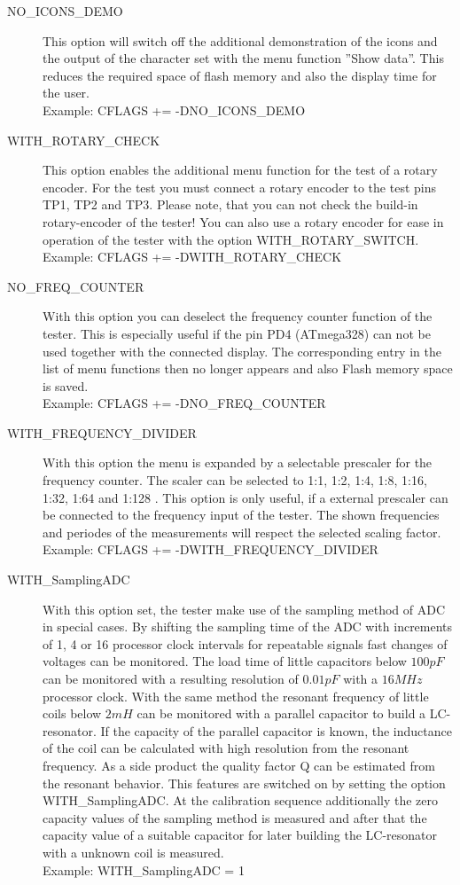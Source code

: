\begin{description}
 \item[NO\_ICONS\_DEMO]
This option will switch off the additional demonstration of the icons and the output of the character set with
the menu function ''Show data''.
This reduces the required space of flash memory  and also the display time for the user.\\
Example: CFLAGS += -DNO\_ICONS\_DEMO

 \item[WITH\_ROTARY\_CHECK]
This option enables the additional menu function for the test of a rotary encoder.
For the test you must connect a rotary encoder to the test pins TP1, TP2 and TP3.
Please note, that you can not check the build-in rotary-encoder of the tester!
You can also use a rotary encoder for ease in operation of the tester with the option WITH\_ROTARY\_SWITCH.\\
Example: CFLAGS += -DWITH\_ROTARY\_CHECK

 \item[NO\_FREQ\_COUNTER]
With this option you can deselect the frequency counter function of the tester.
This is especially useful if the pin PD4 (ATmega328) can not be used together with the
connected display.
The corresponding entry in the list of menu functions then no longer appears and also
Flash memory space is saved.\\
Example: CFLAGS += -DNO\_FREQ\_COUNTER

 \item[WITH\_FREQUENCY\_DIVIDER]
With this option the menu is expanded by a selectable prescaler for the frequency counter.
The scaler can be selected to 1:1, 1:2, 1:4, 1:8, 1:16, 1:32, 1:64 and 1:128 .
This option is only useful, if a external prescaler can be connected to the frequency input of the tester.
The shown frequencies and periodes of the measurements will respect the selected scaling factor.\\
Example: CFLAGS += -DWITH\_FREQUENCY\_DIVIDER

  \item[WITH\_SamplingADC] With this option set, the tester make use of the sampling method of ADC in special cases.
By shifting the sampling time of the ADC with increments of 1, 4 or 16 processor clock intervals for repeatable signals
fast changes of voltages can be monitored.
The load time of little capacitors below \(100pF\) can be monitored with a resulting resolution of \(0.01pF\) with a \(16MHz\) processor clock.
With the same method the resonant frequency of little coils below \(2mH\) can be monitored with a parallel capacitor to build a LC-resonator.
If the capacity of the parallel capacitor is known, the inductance of the coil can be calculated with high resolution from
the resonant frequency. As a side product the quality factor Q can be estimated from the resonant behavior.
This features are switched on by setting the option WITH\_SamplingADC.
At the calibration sequence additionally the zero capacity values of the sampling method is measured and
after that the capacity value of a suitable capacitor for later building the LC-resonator with a unknown coil is measured.\\
Example: WITH\_SamplingADC = 1


\end{description}
